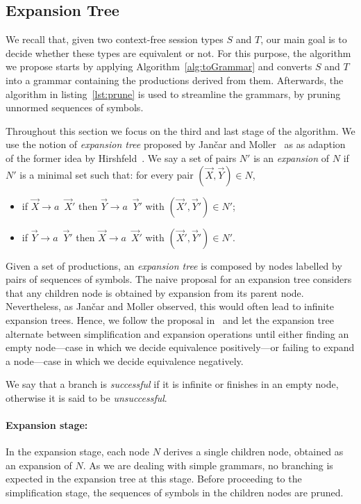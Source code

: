 
\subsection{Expansion Tree}
\label{subsec:expand}

We recall that, given two context-free session types $S$ and $T$, our main goal 
is to decide whether these types are equivalent or not. For this purpose, 
the algorithm we propose starts by applying Algorithm~\ref{alg:toGrammar} 
and converts $S$ and $T$ into a grammar containing the productions derived 
from them. Afterwards, the algorithm in listing~\ref{lst:prune} is used to 
streamline the grammars, by pruning unnormed sequences of symbols.

Throughout this section we focus on the third and last stage of the algorithm.
We use the notion of \emph{expansion tree} proposed by Jan{\v{c}}ar 
and Moller~\cite{janvcar1999techniques} as as adaption of the former idea by 
Hirshfeld~\cite{hirshfeld1996bisimulation}. We say a set of pairs $N'$ is an 
\emph{expansion} of $N$ if $N'$ is a minimal set such that: for every pair 
$(\vec X, \vec Y) \in N$,
\begin{itemize}
	\item if $\vec X \rightarrow a \enspace\vec X'$ then $\vec Y \rightarrow 
		  a \enspace\vec Y'$ with $(\vec X',\vec Y')\in N'$;
	\item if $\vec Y \rightarrow a \enspace\vec Y'$ then $\vec X \rightarrow 
	      a \enspace\vec X'$ with $(\vec X',\vec Y')\in N'$.
\end{itemize}

Given a set of productions, an \emph{expansion tree} is composed by nodes 
labelled by pairs of sequences of symbols. The naive proposal for an
expansion tree considers that any children node is obtained by expansion 
from its parent node. Nevertheless, as Jan{\v{c}}ar and Moller 
observed, this would often lead to infinite expansion trees. Hence,
we follow the proposal in~\cite{janvcar1999techniques} and let the 
expansion tree alternate between simplification and expansion operations
until either finding an empty node---case in which we
decide equivalence positively---or failing to expand a node---case in
which we decide equivalence negatively.

We say that a branch
is \emph{successful} if it is infinite or finishes in an empty node, 
otherwise it is said to be \emph{unsuccessful}.

\paragraph{Expansion stage:}
In the expansion stage, each node $N$ derives a single children node, 
obtained as an expansion of $N$. As we are dealing with simple grammars, 
no branching is expected in the expansion tree at this stage.
Before proceeding to the simplification stage, the sequences of symbols 
in the children nodes are pruned.

